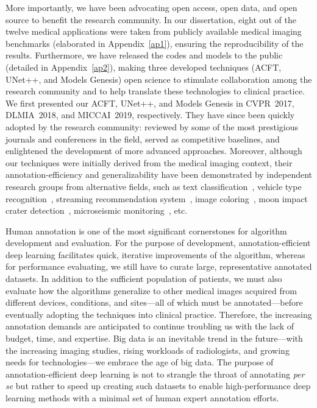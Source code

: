 More importantly, we have been advocating open access, open data, and open source to benefit the research community. In our dissertation, eight out of the twelve medical applications were taken from publicly available medical imaging benchmarks (elaborated in Appendix~\ref{ap1}), ensuring the reproducibility of the results. Furthermore, we have released the codes and models to the public (detailed in Appendix~\ref{ap2}), making three developed techniques (ACFT, UNet++, and Models Genesis) open science to stimulate collaboration among the research community and to help translate these technologies to clinical practice. We first presented our ACFT, UNet++, and Models Genesis in CVPR~2017, DLMIA~2018, and MICCAI~2019, respectively. They have since been quickly adopted by the research community: reviewed by some of the most prestigious journals and conferences in the field, served as competitive baselines, and enlightened the development of more advanced approaches. Moreover, although our techniques were initially derived from the medical imaging context, their annotation-efficiency and generalizability have been demonstrated by independent research groups from alternative fields, such as text classification~\citep{oftedal2019uncertainty}, vehicle type recognition~\citep{huang2019cost}, streaming recommendation system~\citep{guo2019streaming}, image coloring~\citep{di2021color}, moon impact crater detection~\citep{jia2021moon}, microseismic monitoring~\citep{guo2021first}, etc.


Human annotation is one of the most significant cornerstones for algorithm development and evaluation. For the purpose of development, annotation-efficient deep learning facilitates quick, iterative improvements of the algorithm, whereas for performance evaluating, we still have to curate large, representative annotated datasets. In addition to the sufficient population of patients, we must also evaluate how the algorithms generalize to other medical images acquired from different devices, conditions, and sites---all of which must be annotated---before eventually adopting the techniques into clinical practice. Therefore, the increasing annotation demands are anticipated to continue troubling us with the lack of budget, time, and expertise. Big data is an inevitable trend in the future---with the increasing imaging studies, rising workloads of radiologists, and growing needs for technologies---we embrace the age of big data. The purpose of annotation-efficient deep learning is not to strangle the throat of annotating \textit{per se} but rather to speed up creating such datasets to enable high-performance deep learning methods with a minimal set of human expert annotation efforts. 


